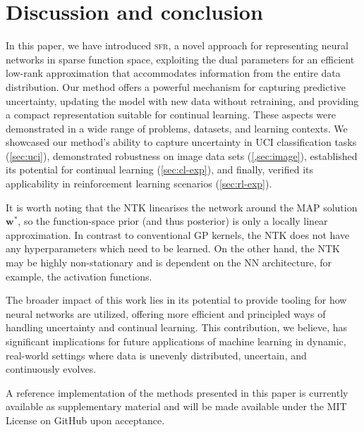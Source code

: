 \documentclass{article}
\newcommand{\our}{\textsc{sfr}\xspace}
\newcommand{\weights}{\ensuremath{\mathbf{w}}}
\begin{document}
\section{Discussion and conclusion}
\label{sec:conclusion}
%
In this paper, we have introduced \our, a novel approach for representing neural networks in sparse function space, exploiting the dual parameters for an efficient low-rank approximation that accommodates information from the entire data distribution. Our method offers a powerful mechanism for capturing predictive uncertainty, updating the model with new data without retraining, and providing a compact representation suitable for continual learning. These aspects were demonstrated in a wide range of problems, datasets, and learning contexts. We showcased our method's ability to capture uncertainty in UCI classification tasks (\cref{sec:uci}), demonstrated robustness on image data sets (\cref{,sec:image}), established its potential for continual learning (\cref{sec:cl-exp}), and finally, verified its applicability in reinforcement learning scenarios (\cref{sec:rl-exp}).

It is worth noting that the NTK linearises the network around the MAP solution $\weights^{*}$,
so the function-space prior (and thus posterior) is only a locally linear approximation.
In contrast to conventional GP kernels, the NTK does not have any hyperparameters which need to be learned.
On the other hand, the NTK may be highly non-stationary and is dependent on the NN architecture, for example, the activation functions.




The broader impact of this work lies in its potential to provide tooling for how neural networks are utilized, offering more efficient and principled ways of handling uncertainty and continual learning. This contribution, we believe, has significant implications for future applications of machine learning in dynamic, real-world settings where data is unevenly distributed, uncertain, and continuously evolves.

A reference implementation of the methods presented in this paper is currently available as supplementary material and will be made available under the MIT License on GitHub upon acceptance.



\end{document}
